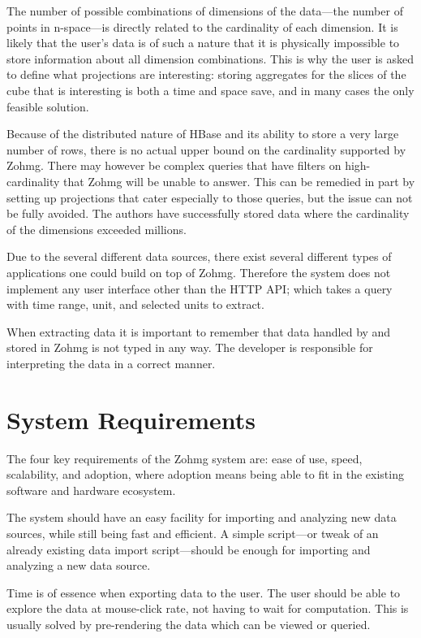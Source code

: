 The number of possible combinations of dimensions of the data---the number
of points in n-space---is directly related to the cardinality of each
dimension. It is likely that the user's data is of such a nature that it is
physically impossible to store information about all dimension
combinations.  This is why the user is asked to define what projections are
interesting: storing aggregates for the slices of the cube that is
interesting is both a time and space save, and in many cases the only
feasible solution.

Because of the distributed nature of HBase and its ability to store a very large
number of rows, there is no actual upper bound on the cardinality supported by
Zohmg. There may however be complex queries that have filters on
high-cardinality that Zohmg will be unable to answer. This can be remedied in
part by setting up projections that cater especially to those queries, but the
issue can not be fully avoided. The authors have successfully stored data where
the cardinality of the dimensions exceeded millions.

Due to the several different data sources, there exist several different types
of applications one could build on top of Zohmg. Therefore the system does not
implement any user interface other than the HTTP API; which takes a query with
time range, unit, and selected units to extract.

When extracting data it is important to remember that data handled by and stored
in Zohmg is not typed in any way. The developer is responsible for interpreting
the data in a correct manner.



\section{System Requirements}


The four key requirements of the Zohmg system are: ease of use, speed,
scalability, and adoption, where adoption means being able to fit in the
existing software and hardware ecosystem.

The system should have an easy facility for importing and analyzing new data
sources, while still being fast and efficient. A simple script---or tweak of an
already existing data import script---should be enough for importing and
analyzing a new data source.

Time is of essence when exporting data to the user. The user should be able to
explore the data at mouse-click rate, not having to wait for computation. This
is usually solved by pre-rendering the data which can be viewed or queried.

